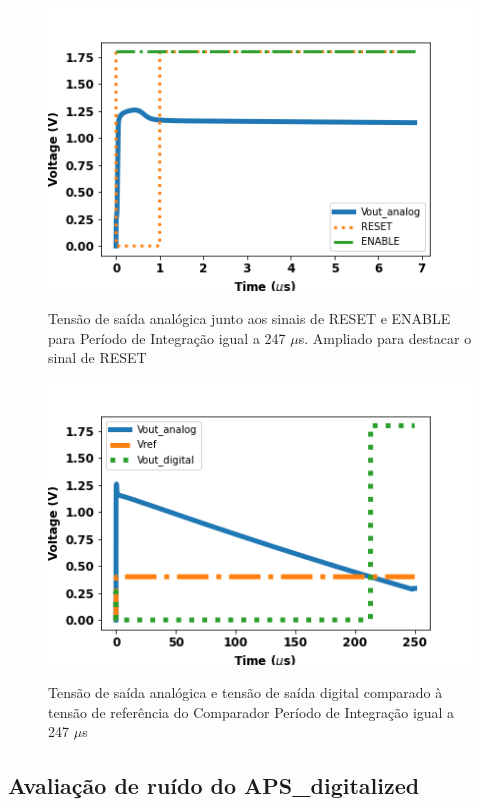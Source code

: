 \begin{figure}[!h]
 \centering
    \centering
    \caption{Tensão de saída analógica junto aos sinais de RESET e ENABLE para Período de Integração igual a 247 $\mu$s. Ampliado para destacar o sinal de RESET}
    \includegraphics[scale=0.6]{Resultados/Graficos/reseteenable-tb_pixel250_zoom.png}
    \label{graf247z}
\end{figure}

\begin{figure}[!h]
 \centering
    \caption{Tensão de saída analógica e tensão de saída digital comparado à tensão de referência do Comparador Período de Integração igual a 247 $\mu$s} 
    \includegraphics[scale=0.6]{Resultados/Graficos/analogicoedigital-tb_pixel250.png}
    \label{graf2472}
\end{figure}

\subsection{Avaliação de ruído do APS\_digitalized}


